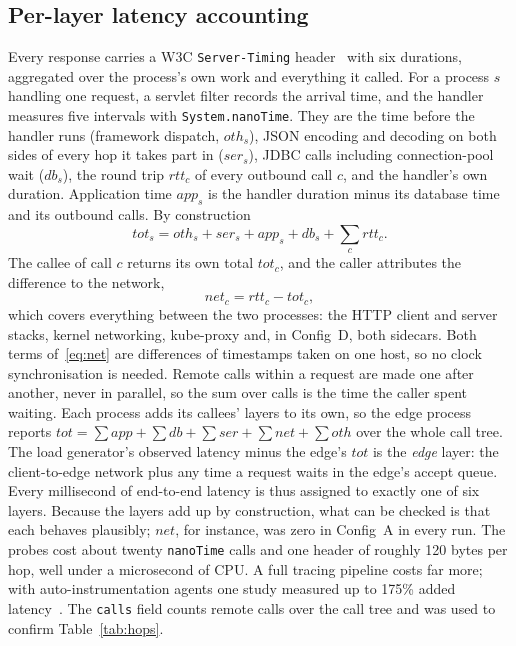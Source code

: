 \subsection{Per-layer latency accounting}
\label{sec:timing}

Every response carries a W3C \texttt{Server-Timing} header~\cite{W3CServerTiming} with six durations,
aggregated over the process's own work and everything it called. For a process $s$ handling one request, a
servlet filter records the arrival time, and the handler measures five intervals with \texttt{System.nanoTime}.
They are the time before the handler runs (framework dispatch, $\mathit{oth}_s$), JSON encoding and decoding on
both sides of every hop it takes part in ($\mathit{ser}_s$), JDBC calls including connection-pool wait
($\mathit{db}_s$), the round trip $\mathit{rtt}_c$ of every outbound call $c$, and the handler's own duration.
Application time $\mathit{app}_s$ is the handler duration minus its database time and its outbound calls. By
construction
\begin{equation}
\mathit{tot}_s = \mathit{oth}_s + \mathit{ser}_s + \mathit{app}_s + \mathit{db}_s + \sum_{c} \mathit{rtt}_c .
\label{eq:tot}
\end{equation}
The callee of call $c$ returns its own total $\mathit{tot}_c$, and the caller attributes the difference to the
network,
\begin{equation}
\mathit{net}_c = \mathit{rtt}_c - \mathit{tot}_c ,
\label{eq:net}
\end{equation}
which covers everything between the two processes: the HTTP client and server stacks, kernel networking,
kube-proxy and, in Config~D, both sidecars. Both terms of~\eqref{eq:net} are differences of timestamps taken
on one host, so no clock synchronisation is needed. Remote calls
within a request are made one after another, never in parallel, so the sum over calls is the time the caller spent
waiting. Each process adds its callees' layers to its own, so the edge process reports
$\mathit{tot} = \sum\mathit{app} + \sum\mathit{db} + \sum\mathit{ser} + \sum\mathit{net} + \sum\mathit{oth}$
over the whole call tree. The load generator's observed latency minus the edge's $\mathit{tot}$ is the
\emph{edge} layer: the client-to-edge network plus any time a request waits in the edge's accept queue.
Every millisecond of end-to-end latency is thus assigned to exactly one of six layers. Because the layers add up
by construction, what can be checked is that each behaves plausibly; $\mathit{net}$, for instance, was zero in
Config~A in every run. The probes cost about twenty \texttt{nanoTime} calls and one header of
roughly 120 bytes per hop, well under a microsecond of CPU. A full tracing pipeline costs far more; with
auto-instrumentation agents one study measured up to 175\% added latency~\cite{Nou2025}. The \texttt{calls} field counts remote calls over the call tree and
was used to confirm Table~\ref{tab:hops}.

